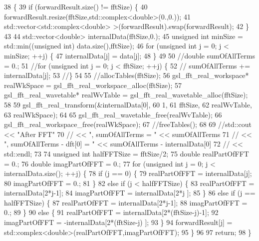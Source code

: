 \begin{DoxyCode}
38 \{
39   \textcolor{keywordflow}{if} (forwardResult.size() != fftSize) \{
40     forwardResult.resize(fftSize,std::complex<double>(0.,0.));
41     std::vector<std::complex<double> >(forwardResult).swap(forwardResult);
42   \}
43 
44   std::vector<double> internalData(fftSize,0.);
45   \textcolor{keywordtype}{unsigned} \textcolor{keywordtype}{int} minSize = std::min((\textcolor{keywordtype}{unsigned} \textcolor{keywordtype}{int}) data.size(),fftSize);
46   \textcolor{keywordflow}{for} (\textcolor{keywordtype}{unsigned} \textcolor{keywordtype}{int} j = 0; j < minSize; ++j) \{
47     internalData[j] = data[j];
48   \}
49 
50   \textcolor{comment}{//double sumOfAllTerms = 0.;}
51   \textcolor{comment}{//for (unsigned int j = 0; j < fftSize; ++j) \{}
52   \textcolor{comment}{//  sumOfAllTerms += internalData[j];}
53   \textcolor{comment}{//\}}
54 
55   \textcolor{comment}{//allocTables(fftSize);}
56   gsl\_fft\_real\_workspace* realWkSpace = gsl\_fft\_real\_workspace\_alloc(fftSize);
57   gsl\_fft\_real\_wavetable* realWvTable = gsl\_fft\_real\_wavetable\_alloc(fftSize);
58 
59   gsl\_fft\_real\_transform(&internalData[0],
60                          1,
61                          fftSize,
62                          realWvTable,
63                          realWkSpace);
64 
65   gsl\_fft\_real\_wavetable\_free(realWvTable);
66   gsl\_fft\_real\_workspace\_free(realWkSpace);
67   \textcolor{comment}{//freeTables();}
68 
69   \textcolor{comment}{//std::cout << "After FFT"}
70   \textcolor{comment}{//          << ", sumOfAllTerms = "          << sumOfAllTerms}
71   \textcolor{comment}{//          << ", sumOfAllTerms - dft[0] = " << sumOfAllTerms - internalData[0]}
72   \textcolor{comment}{//          << std::endl;}
73 
74   \textcolor{keywordtype}{unsigned} \textcolor{keywordtype}{int} halfFFTSize = fftSize/2;
75   \textcolor{keywordtype}{double} realPartOfFFT = 0.;
76   \textcolor{keywordtype}{double} imagPartOfFFT = 0.;
77   \textcolor{keywordflow}{for} (\textcolor{keywordtype}{unsigned} \textcolor{keywordtype}{int} j = 0; j < internalData.size(); ++j) \{
78     \textcolor{keywordflow}{if} (j == 0) \{
79       realPartOfFFT = internalData[j];
80       imagPartOfFFT = 0.;
81     \}
82     \textcolor{keywordflow}{else} \textcolor{keywordflow}{if} (j < halfFFTSize) \{
83       realPartOfFFT = internalData[2*j-1];
84       imagPartOfFFT = internalData[2*j  ];
85     \}
86     \textcolor{keywordflow}{else} \textcolor{keywordflow}{if} (j == halfFFTSize) \{
87       realPartOfFFT = internalData[2*j-1];
88       imagPartOfFFT = 0.;
89     \}
90     \textcolor{keywordflow}{else} \{
91       realPartOfFFT =  internalData[2*(fftSize-j)-1];
92       imagPartOfFFT = -internalData[2*(fftSize-j)  ];
93     \}
94     forwardResult[j] = std::complex<double>(realPartOfFFT,imagPartOfFFT);
95   \}
96 
97   \textcolor{keywordflow}{return};
98 \}
\end{DoxyCode}
